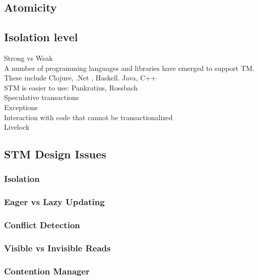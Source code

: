 \subsection{Atomicity}

\subsection{Isolation level}
Strong vs Weak\\





A number of programming languages and libraries have emerged to support TM. These include Clojure, .Net , Haskell. Java, C++\\
STM is easier to use: Pankratius, Rossbach\\
Speculative transactions\\

Exceptions\\
Interaction with code that cannot be transactionalized\\
Livelock\\

\subsection{\ac{STM} Design Issues}

\subsubsection{Isolation}
\subsubsection{Eager vs Lazy Updating}
\subsubsection{Conflict Detection}
\subsubsection{Visible vs Invisible Reads}
\subsubsection{Contention Manager}


